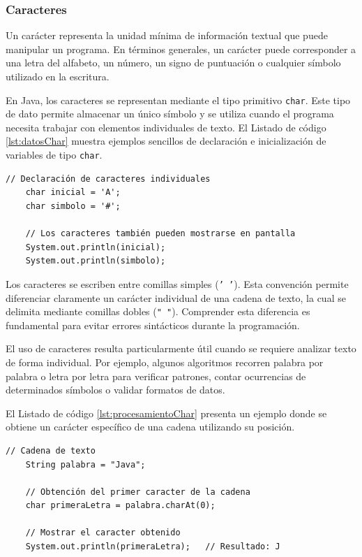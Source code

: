 \documentclass[12pt,twoside]{book}
\begin{document}
					\subsubsection{Caracteres}
						Un carácter representa la unidad mínima de información textual que puede manipular un programa. En términos generales, un carácter puede corresponder a una letra del alfabeto, un número, un signo de puntuación o cualquier símbolo utilizado en la escritura.
						
						En Java, los caracteres se representan mediante el tipo primitivo \texttt{char}. Este tipo de dato permite almacenar un único símbolo y se utiliza cuando el programa necesita trabajar con elementos individuales de texto. El Listado de código \ref{lst:datosChar} muestra ejemplos sencillos de declaración e inicialización de variables de tipo \texttt{char}.
						
						\begin{lstlisting}[style=Java,caption={Datos Carácteres (char).},label={lst:datosChar}]
	// Declaración de caracteres individuales
	char inicial = 'A';
	char simbolo = '#';
	
	// Los caracteres también pueden mostrarse en pantalla
	System.out.println(inicial);
	System.out.println(simbolo); \end{lstlisting}
						
						\noindent
						Los caracteres se escriben entre comillas simples (\texttt{' '}). Esta convención permite diferenciar claramente un carácter individual de una cadena de texto, la cual se delimita mediante comillas dobles (\texttt{" "}). Comprender esta diferencia es fundamental para evitar errores sintácticos durante la programación.
						
						El uso de caracteres resulta particularmente útil cuando se requiere analizar texto de forma individual. Por ejemplo, algunos algoritmos recorren palabra por palabra o letra por letra para verificar patrones, contar ocurrencias de determinados símbolos o validar formatos de datos.
						
						El Listado de código \ref{lst:procesamientoChar} presenta un ejemplo donde se obtiene un carácter específico de una cadena utilizando su posición.
						
						\begin{lstlisting}[style=Java,caption={Acceso a caracteres dentro de una cadena.},label={lst:procesamientoChar}]
	// Cadena de texto
	String palabra = "Java";
	
	// Obtención del primer caracter de la cadena
	char primeraLetra = palabra.charAt(0);
	
	// Mostrar el caracter obtenido
	System.out.println(primeraLetra);   // Resultado: J \end{lstlisting}
						
\end{document}
